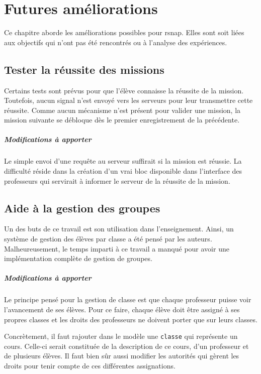 \chapter{Futures améliorations}
\label{futur}
Ce chapitre aborde les améliorations possibles pour \gls{rsnap}. Elles sont soit liées aux objectifs qui n'ont pas été rencontrés ou à l'analyse des expériences.

\section{Tester la réussite des missions}
Certains tests sont prévus pour que l'élève connaisse la réussite de la \gls{mission}. Toutefois, aucun signal n'est envoyé vers les serveurs pour leur transmettre cette réussite. Comme aucun mécanisme n'est présent pour valider une \gls{mission}, la \gls{mission} suivante se débloque dès le premier enregistrement de la précédente.

\paragraph{Modifications à apporter}
Le simple envoi d'une requête au serveur suffirait si la \gls{mission} est réussie. La difficulté réside dans la création d'un vrai \gls{bloc} disponible dans l'interface des professeurs qui servirait à informer le serveur de la réussite de la \gls{mission}.

\section{Aide à la gestion des groupes}
Un des buts de ce travail est son utilisation dans l'enseignement. Ainsi, un système de gestion des élèves par classe a été pensé par les auteurs. Malheureusement, le temps imparti à ce travail a manqué pour avoir une implémentation complète de gestion de groupes.

\paragraph{Modifications à apporter}
Le principe pensé pour la gestion de classe est que chaque professeur puisse voir l'avancement de ses élèves. Pour ce faire, chaque élève doit être assigné à ses propres classes et les droits des professeurs ne doivent porter que sur leurs classes.

Concrètement, il faut rajouter dans le modèle une \texttt{classe} qui représente un cours. Celle-ci serait constituée de la description de ce cours, d'un professeur et de plusieurs élèves. Il faut bien sûr aussi modifier les autorités qui gèrent les droits pour tenir compte de ces différentes assignations.

